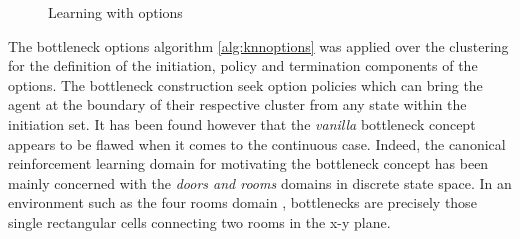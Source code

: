 \documentclass[12pt, oneside, extrafontsizes]{memoir}  %
\theoremstyle{plain}
\theoremstyle{definition}
\begin{document}
\begin{figure}
\centering
{}\hspace{2mm}%
\caption{Learning with options}
\end{figure}

The bottleneck options algorithm \ref{alg:knnoptions} was applied over the clustering for the definition of the initiation, policy and termination components of the options. The bottleneck construction seek option policies which can bring the agent at the boundary of their respective cluster from any state within the initiation set. It has been found however that the \textit{vanilla} bottleneck concept appears to be flawed when it comes to the continuous case. Indeed, the canonical reinforcement learning domain for motivating the bottleneck concept has been mainly concerned with the \textit{doors and rooms} domains in discrete state space. In an environment such as the four rooms domain \cite{Sutton1999}, bottlenecks are precisely those single rectangular cells connecting two rooms in the x-y plane. 
\end{document}
